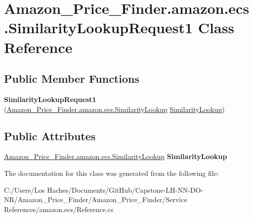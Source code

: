 \hypertarget{class_amazon___price___finder_1_1amazon_1_1ecs_1_1_similarity_lookup_request1}{\section{Amazon\-\_\-\-Price\-\_\-\-Finder.\-amazon.\-ecs.\-Similarity\-Lookup\-Request1 Class Reference}
\label{class_amazon___price___finder_1_1amazon_1_1ecs_1_1_similarity_lookup_request1}
}
\subsection*{Public Member Functions}
\begin{DoxyCompactItemize}
\item 
\hypertarget{class_amazon___price___finder_1_1amazon_1_1ecs_1_1_similarity_lookup_request1_aa4d57ca00a404dc5bd4ed14d72a6abda}{{\bfseries Similarity\-Lookup\-Request1} (\hyperlink{class_amazon___price___finder_1_1amazon_1_1ecs_1_1_similarity_lookup}{Amazon\-\_\-\-Price\-\_\-\-Finder.\-amazon.\-ecs.\-Similarity\-Lookup} \hyperlink{class_amazon___price___finder_1_1amazon_1_1ecs_1_1_similarity_lookup}{Similarity\-Lookup})}\label{class_amazon___price___finder_1_1amazon_1_1ecs_1_1_similarity_lookup_request1_aa4d57ca00a404dc5bd4ed14d72a6abda}

\end{DoxyCompactItemize}
\subsection*{Public Attributes}
\begin{DoxyCompactItemize}
\item 
\hypertarget{class_amazon___price___finder_1_1amazon_1_1ecs_1_1_similarity_lookup_request1_a2f401ee9957412c5963e5402e6eb9569}{\hyperlink{class_amazon___price___finder_1_1amazon_1_1ecs_1_1_similarity_lookup}{Amazon\-\_\-\-Price\-\_\-\-Finder.\-amazon.\-ecs.\-Similarity\-Lookup} {\bfseries Similarity\-Lookup}}\label{class_amazon___price___finder_1_1amazon_1_1ecs_1_1_similarity_lookup_request1_a2f401ee9957412c5963e5402e6eb9569}

\end{DoxyCompactItemize}


The documentation for this class was generated from the following file\-:\begin{DoxyCompactItemize}
\item 
C\-:/\-Users/\-Los Haches/\-Documents/\-Git\-Hub/\-Capstone-\/\-L\-H-\/\-N\-N-\/\-D\-O-\/\-N\-R/\-Amazon\-\_\-\-Price\-\_\-\-Finder/\-Amazon\-\_\-\-Price\-\_\-\-Finder/\-Service References/amazon.\-ecs/Reference.\-cs\end{DoxyCompactItemize}
